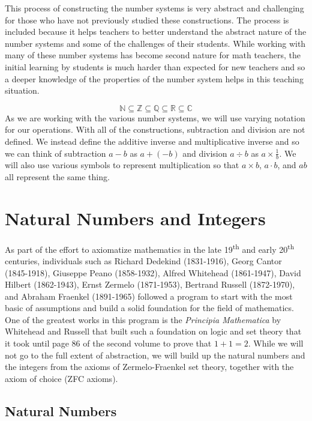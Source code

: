 \documentclass[
]{book}
\theoremstyle{definition}
\theoremstyle{definition}
\theoremstyle{definition}
\theoremstyle{definition}
\theoremstyle{remark}
\begin{document}
This process of constructing the number systems is very abstract and challenging for those who have not previously studied these constructions. The process is included because it helps teachers to better understand the abstract nature of the number systems and some of the challenges of their students. While working with many of these number systems has become second nature for math teachers, the initial learning by students is much harder than expected for new teachers and so a deeper knowledge of the properties of the number system helps in this teaching situation.

\[\mathbb{N} \subseteq \mathbb{Z} \subseteq \mathbb{Q} \subseteq \mathbb{R} \subseteq \mathbb{C}\]
As we are working with the various number systems, we will use varying notation for our operations. With all of the constructions, subtraction and division are not defined. We instead define the additive inverse and multiplicative inverse and so we can think of subtraction \(a-b\) as \(a+(-b)\) and division \(a\div b\) as \(a \times \frac{1}{b}\). We will also use various symbols to represent multiplication so that \(a\times b\), \(a\cdot b\), and \(ab\) all represent the same thing.

\hypertarget{sec:Integers}{%
\section{Natural Numbers and Integers}\label{sec:Integers}}

As part of the effort to axiomatize mathematics in the late 19\textsuperscript{th} and early 20\textsuperscript{th} centuries, individuals such as Richard Dedekind (1831-1916), Georg Cantor (1845-1918), Giuseppe Peano (1858-1932), Alfred Whitehead (1861-1947), David Hilbert (1862-1943), Ernst Zermelo (1871-1953), Bertrand Russell (1872-1970), and Abraham Fraenkel (1891-1965) followed a program to start with the most basic of assumptions and build a solid foundation for the field of mathematics. One of the greatest works in this program is the \emph{Principia Mathematica} by Whitehead and Russell \citetext{\citeyear{Principia1}; \citeyear{Principia2}; \citeyear{Principia3}} that built such a foundation on logic and set theory that it took until page 86 of the second volume to prove that \(1+1=2\). While we will not go to the full extent of abstraction, we will build up the natural numbers and the integers from the axioms of Zermelo-Fraenkel set theory, together with the axiom of choice (ZFC axioms).

\hypertarget{natural-numbers}{%
\subsection{Natural Numbers}\label{natural-numbers}}
\end{document}
